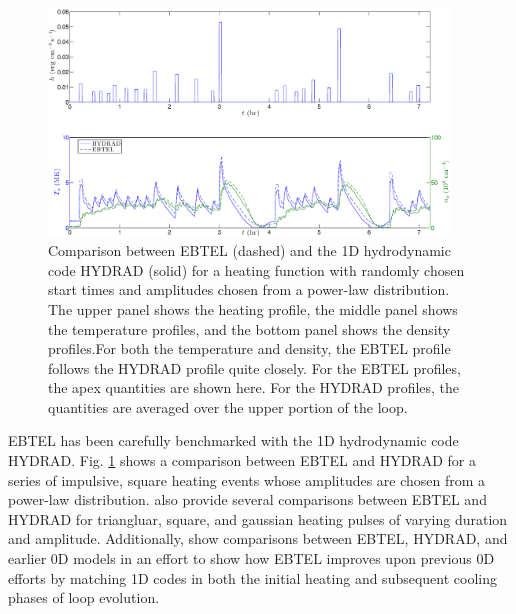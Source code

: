 %
\begin{figure}
	\centering
	\includegraphics[width=0.95\textwidth]{figures/ebtel_sf_compare.eps}
	\caption{Comparison between EBTEL (dashed) and the 1D hydrodynamic code HYDRAD (solid) for a heating function with randomly chosen start times and amplitudes chosen from a power-law distribution. The upper panel shows the heating profile, the middle panel shows the temperature profiles, and the bottom panel shows the density profiles.For both the temperature and density, the EBTEL profile follows the HYDRAD profile quite closely. For the EBTEL profiles, the apex quantities are shown here. For the HYDRAD profiles, the quantities are averaged over the upper portion of the loop.}
	\label{fig:ebtel_sf_compare}
\end{figure}
%
\par EBTEL has been carefully benchmarked with the 1D hydrodynamic code HYDRAD. Fig. \ref{fig:ebtel_sf_compare} shows a comparison between EBTEL and HYDRAD for a series of impulsive, square heating events whose amplitudes are chosen from a power-law distribution. \citet{cargill_enthalpy-based_2012} also provide several comparisons between EBTEL and HYDRAD for triangluar, square, and gaussian heating pulses of varying duration and amplitude. Additionally, \citet{cargill_enthalpy-based_2012-1} show comparisons between EBTEL, HYDRAD, and earlier 0D models in an effort to show how EBTEL improves upon previous 0D efforts by matching 1D codes in both the initial heating and subsequent cooling phases of loop evolution.
%
